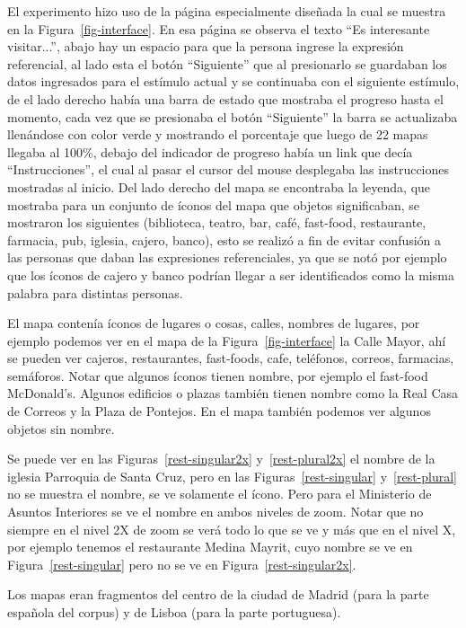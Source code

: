 El experimento hizo uso de la p\'agina especialmente dise\~nada la cual se muestra en la Figura~\ref{fig-interface}. En esa p\'agina se observa el texto ``Es interesante visitar...'', abajo hay un espacio para que la persona ingrese la expresi\'on referencial, al lado esta el bot\'on ``Siguiente'' que  al presionarlo se guardaban los datos ingresados para el est\'imulo actual y se continuaba con el siguiente est\'imulo, de el lado derecho hab\'ia una barra de estado que mostraba el progreso hasta el momento, cada vez que se presionaba el bot\'on ``Siguiente'' la barra se actualizaba llen\'andose con color verde y mostrando el porcentaje que luego de 22 mapas llegaba al 100\%, debajo del indicador de progreso hab\'ia un link que dec\'ia ``Instrucciones'', el cual al pasar el cursor del mouse desplegaba las instrucciones mostradas al inicio.
Del lado derecho del mapa se encontraba la leyenda, que mostraba para un conjunto de \'iconos del mapa que objetos significaban, se mostraron los siguientes (biblioteca, teatro, bar, caf\'e, fast-food, restaurante, farmacia, pub, iglesia, cajero, banco), esto se realiz\'o a fin de evitar confusi\'on a las personas que daban las expresiones referenciales, ya que se not\'o por ejemplo que los \'iconos de cajero y banco podr\'ian llegar a ser identificados como la misma palabra para distintas personas. 

El mapa conten\'ia \'iconos de lugares o cosas, calles, nombres de lugares, por ejemplo podemos ver en el mapa de la Figura~\ref{fig-interface} la Calle Mayor, ah\'i se pueden ver cajeros, restaurantes, fast-foods, cafe, tel\'efonos, correos, farmacias, sem\'aforos. Notar que algunos \'iconos tienen nombre, por ejemplo el fast-food McDonald's. Algunos edificios o plazas tambi\'en tienen nombre como la Real Casa de Correos y la Plaza de Pontejos. En el mapa tambi\'en podemos ver algunos objetos sin nombre.

Se puede ver en las Figuras~\ref{rest-singular2x} y~\ref{rest-plural2x}  el nombre de la iglesia Parroquia de Santa Cruz, pero en las Figuras~\ref{rest-singular} y~\ref{rest-plural} no se muestra el nombre, se ve solamente el \'icono. Pero para el Ministerio de Asuntos Interiores se ve el nombre en ambos niveles de zoom. Notar que no siempre en el nivel 2X de zoom se ver\'a todo lo que se ve y m\'as que en el nivel X, por ejemplo tenemos el restaurante Medina Mayrit, cuyo nombre se ve en Figura~\ref{rest-singular} pero no se ve en Figura~\ref{rest-singular2x}. 

Los mapas eran fragmentos del centro de la ciudad de Madrid (para la parte espa\~nola del corpus) y de Lisboa (para la parte portuguesa).

